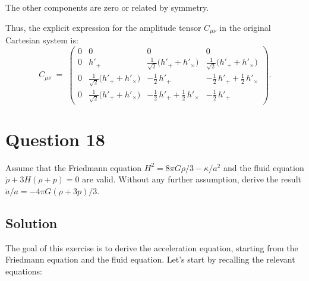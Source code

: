 \documentclass{article}
\begin{document}
The other components are zero or related by symmetry.

Thus, the explicit expression for the amplitude tensor $C_{\mu\nu}$ in the original Cartesian system is:
\[
C_{\mu\nu}
\;=\;
\begin{pmatrix}
0 & 0 & 0 & 0 \\
0 & h'_{+}
 & \tfrac{1}{\sqrt{2}}\bigl(h'_{+} + h'_{\times}\bigr)
 & \tfrac{1}{\sqrt{2}}\bigl(h'_{+} + h'_{\times}\bigr)\\[6pt]
0 & \tfrac{1}{\sqrt{2}}\bigl(h'_{+} + h'_{\times}\bigr)
 & -\tfrac{1}{2}\,h'_{+}
 & -\tfrac{1}{2}\,h'_{+}+\tfrac{1}{2}\,h'_{\times} \\[6pt]
0 & \tfrac{1}{\sqrt{2}}\bigl(h'_{+} + h'_{\times}\bigr)
 & -\tfrac{1}{2}\,h'_{+}+\tfrac{1}{2}\,h'_{\times}
 & -\tfrac{1}{2}\,h'_{+}
\end{pmatrix}.
\]

\section*{Question 18}
Assume that the Friedmann equation $H^{2}=8 \pi G \rho / 3-\kappa / a^{2}$ and the fluid equation $\dot{\rho}+3 H(\rho+p)=0$ are valid. Without any further assumption, derive the result $\ddot{a} / a=-4 \pi G(\rho+3 p) / 3$.

\subsection*{Solution}

The goal of this exercise is to derive the acceleration equation, starting from the Friedmann equation and the fluid equation. Let's start by recalling the relevant equations:
\end{document}
